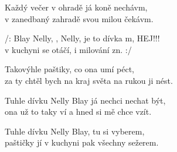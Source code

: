 
\ve
Každý večer v ohradě já koně nechávm,\\
v zanedbaný zahradě svou milou čekávm.

\cho
 /: Blay Nelly, , Nelly, je to dívka m, HEJ!!!\\
v kuchyni se otáčí, i milování zn. :/

\ve
Takovýhle paštiky, co ona umí péct,\\
za ty chtěl bych na kraj světa na rukou ji nést.

\cho

\ve
Tuhle dívku Nelly Blay já nechci nechat být,\\
ona už to taky ví a hned si mě chce vzít.

\cho

\ve
Tuhle dívku Nelly Blay, tu si vyberem,\\
paštičky jí v kuchyni pak všechny sežerem.

\cho

\esong